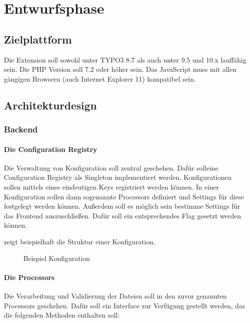 \section{Entwurfsphase} 
\label{sec:Entwurfsphase}

\subsection{Zielplattform}
\label{sec:Zielplattform}

Die Extension soll sowohl unter TYPO3 8.7 als auch unter 9.5 und 10.x lauffähig sein. Die PHP Version soll 7.2 oder höher sein. Das JavaScript muss mit allen gängigen Browsern (auch Internet Explorer 11) kompatibel sein. 


\subsection{Architekturdesign}
\label{sec:Architekturdesign}

\subsubsection{Backend}
\label{sec:Backend}

\paragraph{Die Configuration Registry} Die Verwaltung von Konfiguration soll zentral geschehen. Dafür solleine Configuration Registry als Singleton implementiert werden. Konfigurationen sollen mittels eines eindeutigen Keys registriert werden können. In einer Konfiguration sollen dann sogenannte Processors definiert und Settings für diese festgelegt werden können. Außerdem soll es möglich sein bestimme Settings für das Frontend auszuschließen. Dafür soll ein entsprechendes Flag gesetzt werden können. 

 zeigt beispielhaft die Struktur einer Konfiguration.
\begin{figure}[htb]
\centering
{}
\caption{Beispiel Konfiguration}
\label{fig:beispiel_konfiguration}
\end{figure}

\paragraph{Die Processors} Die Verarbeitung und Validierung der Dateien soll in den zuvor genannten Processors geschehen. Dafür soll ein Interface zur Verfügung gestellt werden, das die folgenden Methoden enthalten soll:

